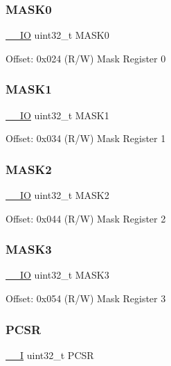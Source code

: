 \subsubsection{\texorpdfstring{MASK0}{MASK0}}
{\footnotesize\ttfamily \mbox{\hyperlink{core__sc300_8h_aec43007d9998a0a0e01faede4133d6be}{\+\_\+\+\_\+\+IO}} uint32\+\_\+t M\+A\+S\+K0}

Offset\+: 0x024 (R/W) Mask Register 0 \mbox{\label{struct_d_w_t___type_ad55962dd61d94bd029f6927adc48bc31}} 
\subsubsection{\texorpdfstring{MASK1}{MASK1}}
{\footnotesize\ttfamily \mbox{\hyperlink{core__sc300_8h_aec43007d9998a0a0e01faede4133d6be}{\+\_\+\+\_\+\+IO}} uint32\+\_\+t M\+A\+S\+K1}

Offset\+: 0x034 (R/W) Mask Register 1 \mbox{\label{struct_d_w_t___type_a860e7bcdcf674491835d91189bda3c61}} 
\subsubsection{\texorpdfstring{MASK2}{MASK2}}
{\footnotesize\ttfamily \mbox{\hyperlink{core__sc300_8h_aec43007d9998a0a0e01faede4133d6be}{\+\_\+\+\_\+\+IO}} uint32\+\_\+t M\+A\+S\+K2}

Offset\+: 0x044 (R/W) Mask Register 2 \mbox{\label{struct_d_w_t___type_a541b20e412d5586312fa4dac4a151660}} 
\subsubsection{\texorpdfstring{MASK3}{MASK3}}
{\footnotesize\ttfamily \mbox{\hyperlink{core__sc300_8h_aec43007d9998a0a0e01faede4133d6be}{\+\_\+\+\_\+\+IO}} uint32\+\_\+t M\+A\+S\+K3}

Offset\+: 0x054 (R/W) Mask Register 3 \mbox{\label{struct_d_w_t___type_accef6b622c8a41342ed32345b0922bea}} 
\subsubsection{\texorpdfstring{PCSR}{PCSR}}
{\footnotesize\ttfamily \mbox{\hyperlink{core__sc300_8h_af63697ed9952cc71e1225efe205f6cd3}{\+\_\+\+\_\+I}} uint32\+\_\+t P\+C\+SR}

